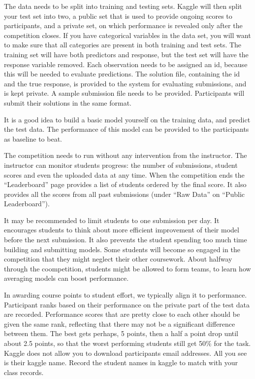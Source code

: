 \documentclass[12pt]{article}
\begin{document}
The data needs to be split into training and testing sets. Kaggle will
then split your test set into two, a public set that is used to provide
ongoing scores to participants, and a private set, on which performance
is revealed only after the competition closes. If you have categorical
variables in the data set, you will want to make sure that all
categories are present in both training and test sets. The training set
will have both predictors and response, but the test set will have the
response variable removed. Each observation needs to be assigned an id,
because this will be needed to evaluate predictions. The solution file,
containing the id and the true response, is provided to the system for
evaluating submissions, and is kept private. A sample submission file
needs to be provided. Participants will submit their solutions in the
same format.

It is a good idea to build a basic model yourself on the training data,
and predict the test data. The performance of this model can be provided
to the participants as baseline to beat.

The competition needs to run without any intervention from the
instructor. The instructor can monitor students progress: the number of
submissions, student scores and even the uploaded data at any time. When
the competition ends the ``Leaderboard'' page provides a list of
students ordered by the final score. It also provides all the scores
from all past submissions (under ``Raw Data'' on ``Public
Leaderboard'').

It may be recommended to limit students to one submission per day. It
encourages students to think about more efficient improvement of their
model before the next submission. It also prevents the student spending
too much time building and submitting models. Some students will become
so engaged in the competition that they might neglect their other
coursework. About halfway through the coompetition, students might be
allowed to form teams, to learn how averaging models can boost
performance.

In awarding course points to student effort, we typically align it to
performance. Participant ranks based on their performance on the private
part of the test data are recorded. Performance scores that are pretty
close to each other should be given the same rank, reflecting that there
may not be a significant difference between them. The best gets perhaps,
5 points, then a half a point drop until about 2.5 points, so that the
worst performing students still get 50\% for the task. Kaggle does not
allow you to download participants email addresses. All you see is their
kaggle name. Record the student names in kaggle to match with your class
records.
\end{document}

